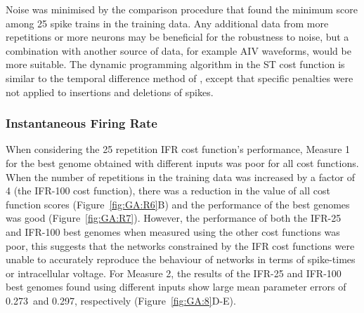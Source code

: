 \smallskip{}

Noise was minimised by the comparison procedure that found the minimum
score among 25 spike trains in the training data. Any additional data from
more repetitions or more neurons may be beneficial for the robustness to
noise, but a combination with another source of data, for example AIV
waveforms, would be more suitable. The dynamic programming algorithm in the
ST cost function is similar to the temporal difference method of
\citet{VictorGoldbergEtAl:2007}, except that specific penalties were not
applied to insertions and deletions of spikes.


\subsubsection{Instantaneous Firing Rate }\label{sec:GA:inst-firing-rate-summ}

 When
considering the 25 repetition IFR cost function's performance, Measure 1
for the best genome obtained with different inputs was poor for all cost
functions. When the number of repetitions in the training data was
increased by a factor of 4 (the IFR-100 cost function), there was a
reduction in the value of all cost function scores
(Figure~\ref{fig:GA:R6}B) and the performance of the best genomes was good
(Figure~\ref{fig:GA:R7}). However, the performance of both the IFR-25 and
IFR-100 best genomes when measured using the other cost functions was poor,
this suggests that the networks constrained by the IFR cost functions were
unable to accurately reproduce the behaviour of networks in terms of
spike-times or intracellular
voltage. %
For Measure 2, the results of the IFR-25 and IFR-100 best genomes found using
different inputs show large mean parameter errors of 0.273~and 0.297,
respectively (Figure~\ref{fig:GA:8}D-E).

